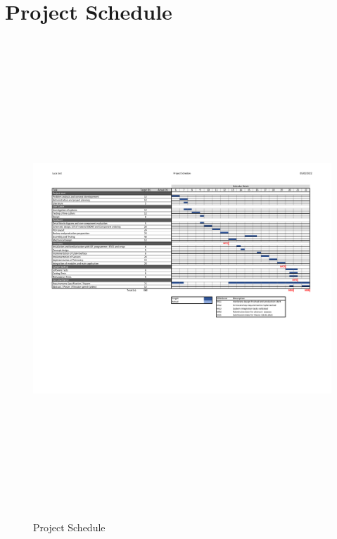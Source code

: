 \newpage
\section{Project Schedule}
\label{sec:project_schedule}

\begin{figure}[h!]
	\centering
	\includegraphics[height=18cm, angle=90, trim=15mm 0mm 17mm 0mm, clip]{images/Project_Schedule_220205.pdf}
	\caption{Project Schedule}
	\vspace{-2ex}
	\label{fig:project_schedule}
\end{figure}
